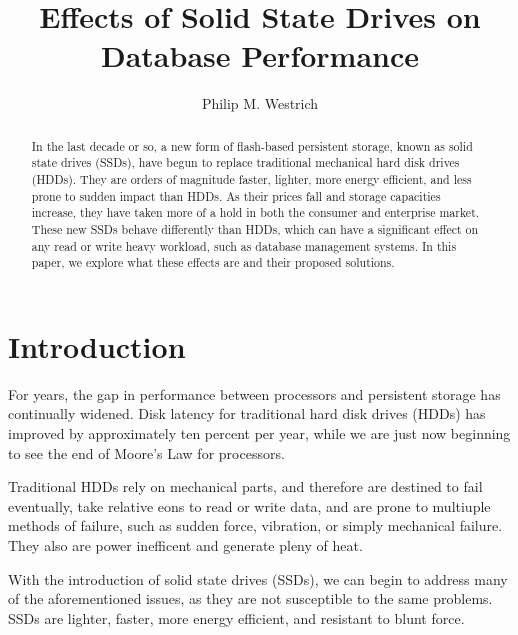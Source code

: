 \documentclass[format=acmsmall, review=false, screen=true]{acmart}
\begin{document}
\title[Short Title]{Effects of Solid State Drives on Database Performance}  
\author{Philip M. Westrich}

\begin{abstract}

    In the last decade or so, a new form of flash-based persistent storage, known as solid state drives (SSDs), have begun 
    to replace traditional mechanical hard disk drives (HDDs). They are orders of magnitude faster, lighter, more energy 
    efficient, and less prone to sudden impact than HDDs. As their prices fall and storage capacities increase, they have 
    taken more of a hold in both the consumer and enterprise market. These new SSDs behave differently than HDDs, which can 
    have a significant effect on any read or write heavy workload, such as database management systems. In this paper, we explore 
    what these effects are and their proposed solutions.
 
\end{abstract}

\maketitle

\section{Introduction}

For years, the gap in performance between processors and persistent storage has continually widened. Disk latency for 
traditional hard disk drives (HDDs) has improved by approximately ten percent per year, while we are just now beginning 
to see the end of Moore's Law for processors. \cite{Xie2011}

Traditional HDDs rely on mechanical parts, and therefore are destined to fail eventually, take relative eons to read 
or write data, and are prone to multiuple methods of failure, such as sudden force, vibration, or simply mechanical 
failure. They also are power inefficent and generate pleny of heat. \cite{Xie2011}

With the introduction of solid state drives (SSDs), we can begin to address many of the aforementioned issues, as they 
are not susceptible to the same problems. SSDs are lighter, faster, more energy efficient, and resistant to blunt force.
\cite{Xie2011} 
\end{document}
